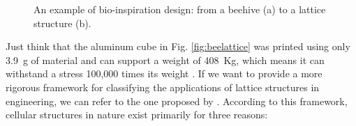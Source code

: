 \begin{figure}
    \centering
    \quad
    \caption[Bio-inspiration design.]{An example of bio-inspiration design: from a beehive (a) to a lattice structure (b).}
    \label{fig:bioinsp}
\end{figure}
Just think that the aluminum cube in Fig. \ref{fig:beelattice} was printed using only \SI{3.9}{g} of material and can support a weight of \SI{408}{Kg}, which means it can withstand a stress 100,000 times its weight \cite{noauthor_3d_2014}. If we want to provide a more rigorous framework for classifying the applications of lattice structures in engineering, we can refer to the one proposed by \citeauthor{mcnulty_framework_2017}. According to this framework, cellular structures in nature exist primarily for three reasons:
